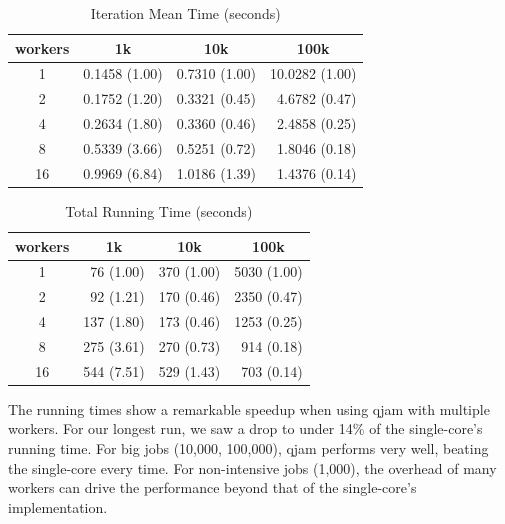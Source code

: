 \documentclass[%
  final,
  notitlepage,
  narroweqnarray,
  inline,
]{ieee}
\begin{document}
\begin{table}[htbp]
  \label{table_iteration_mean_time}
  \caption{Iteration Mean Time (seconds)}
  \small
  \begin{center}
    \begin{tabular}{crrr}
    workers  & \multicolumn{1}{c}{1k} & \multicolumn{1}{c}{10k}
             & \multicolumn{1}{c}{100k} \\
      \hline
    1  & 0.1458 (1.00) & 0.7310 (1.00) & 10.0282 (1.00) \\
    2  & 0.1752 (1.20) & 0.3321 (0.45) & 4.6782  (0.47) \\
    4  & 0.2634 (1.80) & 0.3360 (0.46) & 2.4858  (0.25) \\
    8  & 0.5339 (3.66) & 0.5251 (0.72) & 1.8046  (0.18) \\
    16 & 0.9969 (6.84) & 1.0186 (1.39) & 1.4376  (0.14) \\
    \end{tabular}
  \end{center}
\end{table}


\begin{table}[htbp]
  \label{table_total_running_time}
  \caption{Total Running Time (seconds)}
  \small
  \begin{center}
    \begin{tabular}{crrr}
    workers  & \multicolumn{1}{c}{1k} & \multicolumn{1}{c}{10k}
             & \multicolumn{1}{c}{100k} \\
      \hline
    1  &  76  (1.00) & 370 (1.00) & 5030 (1.00) \\
    2  &  92  (1.21) & 170 (0.46) & 2350 (0.47) \\
    4  & 137  (1.80) & 173 (0.46) & 1253 (0.25) \\
    8  & 275  (3.61) & 270 (0.73) & 914  (0.18) \\
    16 & 544  (7.51) & 529 (1.43) & 703  (0.14) \\
    \end{tabular}
  \end{center}
\end{table}


The running times show a remarkable speedup when using qjam with multiple
workers. For our longest run, we saw a drop to under 14\% of the single-core's
running time. For big jobs (10,000, 100,000), qjam performs very well, beating
the single-core every time. For non-intensive jobs (1,000), the overhead of many
workers can drive the performance beyond that of the single-core's
implementation.
\end{document}
